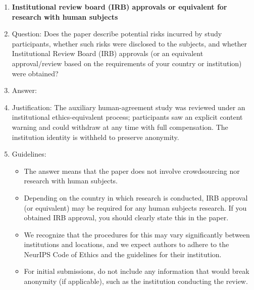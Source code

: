 \begin{enumerate}
\item {\bf Institutional review board (IRB) approvals or equivalent for research with human subjects}
    \item[] Question: Does the paper describe potential risks incurred by study participants, whether such risks were disclosed to the subjects, and whether Institutional Review Board (IRB) approvals (or an equivalent approval/review based on the requirements of your country or institution) were obtained?
    \item[] Answer: \answerYes{}
    \item[] Justification: The auxiliary human-agreement study was reviewed under an institutional ethics-equivalent process; participants saw an explicit content warning and could withdraw at any time with full compensation. The institution identity is withheld to preserve anonymity.
    \item[] Guidelines:
    \begin{itemize}
        \item The answer \answerNA{} means that the paper does not involve crowdsourcing nor research with human subjects.
        \item Depending on the country in which research is conducted, IRB approval (or equivalent) may be required for any human subjects research. If you obtained IRB approval, you should clearly state this in the paper.
        \item We recognize that the procedures for this may vary significantly between institutions and locations, and we expect authors to adhere to the NeurIPS Code of Ethics and the guidelines for their institution.
        \item For initial submissions, do not include any information that would break anonymity (if applicable), such as the institution conducting the review.
    \end{itemize}


\end{enumerate}
